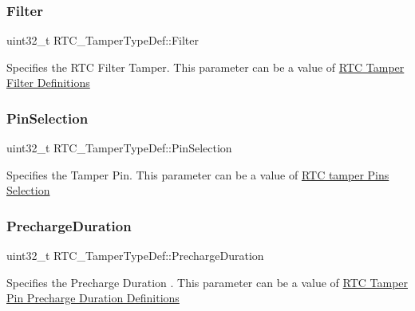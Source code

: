 \subsubsection{\texorpdfstring{Filter}{Filter}}
{\footnotesize\ttfamily uint32\+\_\+t R\+T\+C\+\_\+\+Tamper\+Type\+Def\+::\+Filter}

Specifies the R\+TC Filter Tamper. This parameter can be a value of \hyperlink{group___r_t_c_ex___tamper___filter___definitions}{R\+TC Tamper Filter Definitions} \mbox{\label{struct_r_t_c___tamper_type_def_a676c56a1ad581d88cf71b5b54d5f7075}} 
\subsubsection{\texorpdfstring{Pin\+Selection}{PinSelection}}
{\footnotesize\ttfamily uint32\+\_\+t R\+T\+C\+\_\+\+Tamper\+Type\+Def\+::\+Pin\+Selection}

Specifies the Tamper Pin. This parameter can be a value of \hyperlink{group___r_t_c_ex___tamper___pins___selection}{R\+TC tamper Pins Selection} \mbox{\label{struct_r_t_c___tamper_type_def_ad447306575b3590e268fe3398f9bb517}} 
\subsubsection{\texorpdfstring{Precharge\+Duration}{PrechargeDuration}}
{\footnotesize\ttfamily uint32\+\_\+t R\+T\+C\+\_\+\+Tamper\+Type\+Def\+::\+Precharge\+Duration}

Specifies the Precharge Duration . This parameter can be a value of \hyperlink{group___r_t_c_ex___tamper___pin___precharge___duration___definitions}{R\+TC Tamper Pin Precharge Duration Definitions} \mbox{\label{struct_r_t_c___tamper_type_def_a1822a9001e16621e16cd87b065b92e2a}} 
